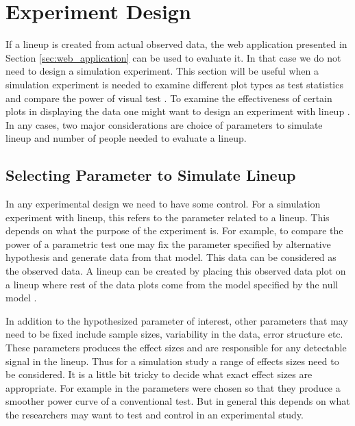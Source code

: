 \documentclass[11pt]{article}
\begin{document}
\section{Experiment Design} \label{sec:turk_exp}

If a lineup is created from actual observed data, the web application presented in Section \ref{sec:web_application} can be used to evaluate it. In that case we do not need to design a simulation experiment. This section will be useful when a simulation experiment is needed to examine different plot types as test statistics and compare the power of visual test \citep{majumder:2013}. To examine the effectiveness of certain plots in displaying the data one might want to design an experiment with lineup \citep{heike:2012}. In any cases, two major considerations are choice of parameters to simulate lineup and number of people needed to evaluate a lineup.

\subsection{Selecting Parameter to Simulate Lineup} \label{sec:parameter_selection} In any experimental design we need to have some control. For a simulation experiment with lineup, this refers to the parameter related to a lineup. This depends on what the purpose of the experiment is. For example, to compare the power of a parametric test one may fix the parameter specified by alternative hypothesis and generate data from that model. This data can be considered as the observed data. A lineup can be created by placing this observed data plot on a lineup where rest of the data plots come from the model specified by the null model \citep{majumder:2013}. 

In addition to the hypothesized parameter of interest, other parameters that may need to be fixed include sample sizes, variability in the data, error structure etc. These parameters produces the effect sizes and are responsible for any detectable signal in the lineup. Thus for a simulation study a range of effects sizes need to be considered. It is a little bit tricky to decide what exact effect sizes are appropriate. For example in \cite{majumder:2013} the parameters were chosen so that they produce a smoother power curve of a conventional test. But in general this depends on what the researchers may want to test and control in an experimental study.

\end{document}
